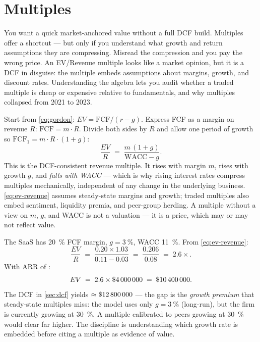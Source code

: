 \section{Multiples}\label{sec:multiples}

You want a quick market-anchored value without a full DCF build. Multiples offer a shortcut
--- but only if you understand what growth and return assumptions they are compressing.
Misread the compression and you pay the wrong price. An EV/Revenue multiple looks like a
market opinion, but it is a DCF in disguise: the multiple embeds assumptions about margins,
growth, and discount rates. Understanding the algebra lets you audit whether a traded
multiple is cheap or expensive relative to fundamentals, and why multiples collapsed from
2021 to 2023.

Start from \cref{eq:gordon}: \(EV = \mathrm{FCF}/(r-g)\). Express FCF as a margin on
revenue \(R\): \(\mathrm{FCF}=m\cdot R\). Divide both sides by \(R\) and allow one period
of growth so \(\mathrm{FCF}_1 = m\cdot R\cdot(1+g)\):
\begin{equation}\label{eq:ev-revenue}
  \frac{EV}{R} \;=\; \frac{m\,(1+g)}{\mathrm{WACC}-g}.
\end{equation}
This is the DCF-consistent revenue multiple. It rises with margin \(m\), rises with growth
\(g\), and \emph{falls with WACC} --- which is why rising interest rates compress multiples
mechanically, independent of any change in the underlying business. \cref{eq:ev-revenue}
assumes steady-state margins and growth; traded multiples also embed sentiment, liquidity
premia, and peer-group herding. A multiple without a view on \(m\), \(g\), and WACC is not
a valuation --- it is a price, which may or may not reflect value.

\begin{example}
The SaaS has \qty{20}{\percent} FCF margin, \(g=\qty{3}{\percent}\), WACC \qty{11}{\percent}.
From \cref{eq:ev-revenue}:
\[
  \frac{EV}{R} \;=\; \frac{0.20\times1.03}{0.11-0.03} \;=\; \frac{0.206}{0.08} \;=\; 2.6\times.
\]
With ARR of :
\[
  EV \;=\; 2.6\times\$\num{4000000} \;=\; \$\num{10400000}.
\]
The DCF in \cref{sec:dcf} yields \(\approx\$\num{12800000}\) --- the
 gap is the \emph{growth premium} that steady-state multiples miss:
the model uses only \(g=\qty{3}{\percent}\) (long-run), but the firm is currently
growing at \qty{30}{\percent}. A multiple calibrated to peers growing at
\qty{30}{\percent} would clear far higher. The discipline is understanding which
growth rate is embedded before citing a multiple as evidence of value.
\end{example}

